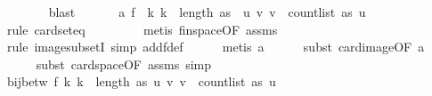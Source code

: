 \begin{isabellebody}
\ \ \ \ \ \ \isamarkupfalse%
\ blast\isanewline
\ \ \isamarkupfalse%
\isanewline
\ \ \isamarkupfalse%
\ a{}{\isacharcolon}{\kern0pt}\ {\isachardoublequoteopen}f\ {\isacharbackquote}{\kern0pt}\ {\isacharbraceleft}{\kern0pt}k{\isachardot}{\kern0pt}\ k\ {\isacharless}{\kern0pt}\ length\ as{\isacharbraceright}{\kern0pt}\ {\isacharequal}{\kern0pt}\ {\isacharbraceleft}{\kern0pt}{\isacharparenleft}{\kern0pt}u{\isacharcomma}{\kern0pt}\ v{\isacharparenright}{\kern0pt}{\isachardot}{\kern0pt}\ v\ {\isacharless}{\kern0pt}\ count{\isacharunderscore}{\kern0pt}list\ as\ u{\isacharbraceright}{\kern0pt}{\isachardoublequoteclose}\isanewline
\ \ \ \ \isamarkupfalse%
\ {\isacharparenleft}{\kern0pt}rule\ card{\isacharunderscore}{\kern0pt}seteq{\isacharparenright}{\kern0pt}\ \isanewline
\ \ \ \ \ \ \isamarkupfalse%
\ {\isacharparenleft}{\kern0pt}metis\ fin{\isacharunderscore}{\kern0pt}space{\isacharbrackleft}{\kern0pt}OF\ assms{\isacharparenleft}{\kern0pt}{}{\isacharparenright}{\kern0pt}{\isacharbrackright}{\kern0pt}{\isacharparenright}{\kern0pt}\isanewline
\ \ \ \ \ \isamarkupfalse%
\ {\isacharparenleft}{\kern0pt}rule\ image{\isacharunderscore}{\kern0pt}subsetI{\isacharcomma}{\kern0pt}\ simp\ add{\isacharcolon}{\kern0pt}f{\isacharunderscore}{\kern0pt}def{\isacharparenright}{\kern0pt}\isanewline
\ \ \ \ \isamarkupfalse%
\ {\isacharparenleft}{\kern0pt}metis\ a{}{\isacharunderscore}{\kern0pt}{}{\isacharparenright}{\kern0pt}\isanewline
\ \ \ \ \isamarkupfalse%
\ {\isacharparenleft}{\kern0pt}subst\ card{\isacharunderscore}{\kern0pt}image{\isacharbrackleft}{\kern0pt}OF\ a{}{\isacharbrackright}{\kern0pt}{\isacharparenright}{\kern0pt}\isanewline
\ \ \ \ \isamarkupfalse%
\ {\isacharparenleft}{\kern0pt}subst\ card{\isacharunderscore}{\kern0pt}space{\isacharbrackleft}{\kern0pt}OF\ assms{\isacharparenleft}{\kern0pt}{}{\isacharparenright}{\kern0pt}{\isacharbrackright}{\kern0pt}{\isacharcomma}{\kern0pt}\ simp{\isacharparenright}{\kern0pt}\isanewline
\isanewline
\ \ \isamarkupfalse%
\ {\isachardoublequoteopen}bij{\isacharunderscore}{\kern0pt}betw\ f\ {\isacharbraceleft}{\kern0pt}k{\isachardot}{\kern0pt}\ k\ {\isacharless}{\kern0pt}\ length\ as{\isacharbraceright}{\kern0pt}\ {\isacharbraceleft}{\kern0pt}{\isacharparenleft}{\kern0pt}u{\isacharcomma}{\kern0pt}\ v{\isacharparenright}{\kern0pt}{\isachardot}{\kern0pt}\ v\ {\isacharless}{\kern0pt}\ count{\isacharunderscore}{\kern0pt}list\ as\ u{\isacharbraceright}{\kern0pt}{\isachardoublequoteclose}\isanewline

\end{isabellebody}
